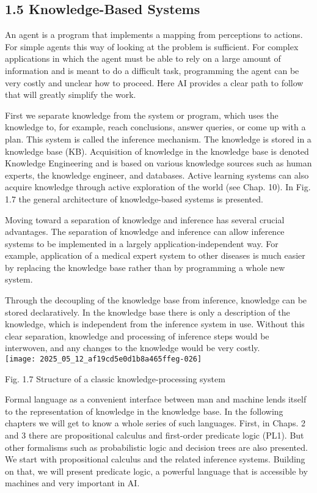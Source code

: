 \documentclass[10pt]{article}
\begin{document}
\subsection*{1.5 Knowledge-Based Systems}
An agent is a program that implements a mapping from perceptions to actions. For simple agents this way of looking at the problem is sufficient. For complex applications in which the agent must be able to rely on a large amount of information and is meant to do a difficult task, programming the agent can be very costly and unclear how to proceed. Here AI provides a clear path to follow that will greatly simplify the work.

First we separate knowledge from the system or program, which uses the knowledge to, for example, reach conclusions, answer queries, or come up with a plan. This system is called the inference mechanism. The knowledge is stored in a knowledge base (KB). Acquisition of knowledge in the knowledge base is denoted Knowledge Engineering and is based on various knowledge sources such as human experts, the knowledge engineer, and databases. Active learning systems can also acquire knowledge through active exploration of the world (see Chap. 10). In Fig. 1.7 the general architecture of knowledge-based systems is presented.

Moving toward a separation of knowledge and inference has several crucial advantages. The separation of knowledge and inference can allow inference systems to be implemented in a largely application-independent way. For example, application of a medical expert system to other diseases is much easier by replacing the knowledge base rather than by programming a whole new system.

Through the decoupling of the knowledge base from inference, knowledge can be stored declaratively. In the knowledge base there is only a description of the knowledge, which is independent from the inference system in use. Without this clear separation, knowledge and processing of inference steps would be interwoven, and any changes to the knowledge would be very costly.\\
\texttt{[image: 2025\_05\_12\_af19cd5e0d1b8a465ffeg-026]}

Fig. 1.7 Structure of a classic knowledge-processing system

Formal language as a convenient interface between man and machine lends itself to the representation of knowledge in the knowledge base. In the following chapters we will get to know a whole series of such languages. First, in Chaps. 2 and 3 there are propositional calculus and first-order predicate logic (PL1). But other formalisms such as probabilistic logic and decision trees are also presented. We start with propositional calculus and the related inference systems. Building on that, we will present predicate logic, a powerful language that is accessible by machines and very important in AI.
\end{document}
